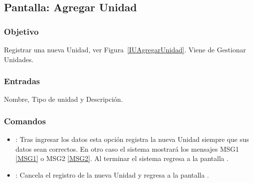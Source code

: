 \subsection{Pantalla: Agregar Unidad}

\subsubsection{Objetivo}
Registrar una nueva Unidad, ver Figura~\ref{IUAgregarUnidad}. Viene de Gestionar Unidades.


\subsubsection{Entradas}
Nombre, Tipo de unidad y Descripción.

\subsubsection{Comandos}
\begin{itemize}
	\item {}: Tras ingresar los datos esta opción registra la nueva Unidad siempre que sus datos sean correctos. En otro caso el sistema mostrará los mensajes MSG1 \ref{MSG1} o MSG2 \ref{MSG2}. Al terminar el sistema regresa a la pantalla .
	\item {}: Cancela el registro de la nueva Unidad y regresa a la pantalla .
\end{itemize}




